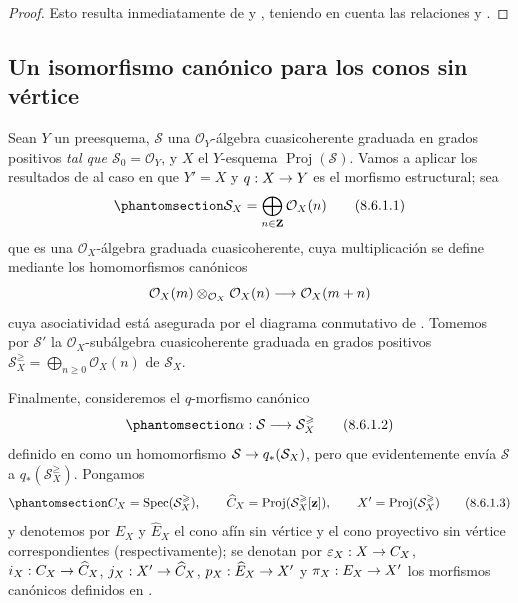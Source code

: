 \documentclass[oneside,10pt]{amsart}
\makeatletter
\renewcommand{\geq}{\geqslant}
\newcommand{\ega@arrow}[2]{\mathchoice{#1}{#2}{#2}{#2}}
\renewcommand{\to}{\ega@arrow{\longrightarrow}{\rightarrow}}
\newcommand{\oldpage}[2][]{\marginnote{\normalfont\footnotesize\textbf{#1}~|~#2}\ignorespaces}
\let\EGAOriginalLabel\label
\renewcommand{\label}[1]{\phantomsection\EGAOriginalLabel{#1}}
\makeatother
\begin{document}
\begin{proof}
Esto resulta inmediatamente de  y , teniendo en cuenta las relaciones  y .
\end{proof}
\subsection{Un isomorfismo canónico para los conos sin vértice}
\label{subsection:II.8.6-fr}

\begin{env}[8.6.1]
\label{II.8.6.1-fr}
Sean $Y$ un preesquema, $\mathcal{S}$ una $\mathcal{O}_Y$-álgebra cuasicoherente graduada en grados positivos \emph{tal que $\mathcal{S}_0=\mathcal{O}_Y$}, y $X$ el $Y$-esquema $\operatorname{Proj}(\mathcal{S})$.
Vamos a aplicar los resultados de  al caso en que $Y'=X$ y $q:X\to Y$ es el morfismo estructural;
sea
\begin{equation}
\label{II.8.6.1.1-fr}
  \mathcal{S}_X=\bigoplus_{n\in\mathbf{Z}}\mathcal{O}_X(n)
\tag{8.6.1.1}
\end{equation}
\oldpage[II]{172}
que es una $\mathcal{O}_X$-álgebra graduada cuasicoherente, cuya multiplicación se define mediante los homomorfismos canónicos 
\[
  \mathcal{O}_X(m)\otimes_{\mathcal{O}_X}\mathcal{O}_X(n)
  \to\mathcal{O}_X(m+n)
\]
cuya asociatividad está asegurada por el diagrama conmutativo de .
Tomemos por $\mathcal{S}'$ la $\mathcal{O}_X$-subálgebra cuasicoherente graduada en grados positivos $\mathcal{S}_X^{\geq}=\bigoplus_{n\geq0}\mathcal{O}_X(n)$ de $\mathcal{S}_X$.

Finalmente, consideremos el $q$-morfismo canónico
\begin{equation}
\label{II.8.6.1.2-fr}
  \alpha:\mathcal{S}\to\mathcal{S}_X^{\geq}
\tag{8.6.1.2}
\end{equation}
definido en  como un homomorfismo $\mathcal{S}\to q_*(\mathcal{S}_X)$, pero que evidentemente envía $\mathcal{S}$ a $q_*(\mathcal{S}_X^{\geq})$.
Pongamos
\begin{equation}
\label{II.8.6.1.3-fr}
  C_X=\operatorname{Spec}(\mathcal{S}_X^{\geq}),\qquad
  \widehat{C}_X=\operatorname{Proj}(\mathcal{S}_X^{\geq}[\mathbf{z}]),\qquad
  X'=\operatorname{Proj}(\mathcal{S}_X^{\geq})
\tag{8.6.1.3}
\end{equation}
y denotemos por $E_X$ y $\widehat{E}_X$ el cono afín sin vértice y el cono proyectivo sin vértice correspondientes (respectivamente);
se denotan por $\varepsilon_X:X\to C_X$, $i_X:C_X\to\widehat{C}_X$, $j_X:X'\to\widehat{C}_X$, $p_X:\widehat{E}_X\to X'$ y $\pi_X:E_X\to X'$ los morfismos canónicos definidos en .
\end{env}
\end{document}
